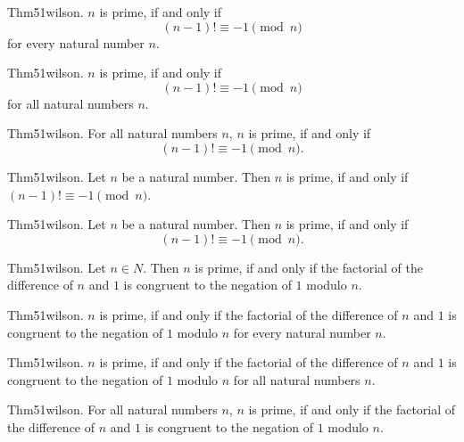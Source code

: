 \documentclass{article}
\begin{document}
Thm51wilson. $n$ is prime, if and only if $$(n - 1)! \equiv - 1 \pmod{ n}$$ for every natural number $n$.

Thm51wilson. $n$ is prime, if and only if $$(n - 1)! \equiv - 1 \pmod{ n}$$ for all natural numbers $n$.

Thm51wilson. For all natural numbers $n$, $n$ is prime, if and only if $$(n - 1)! \equiv - 1 \pmod{ n}.$$

Thm51wilson. Let $n$ be a natural number. Then $n$ is prime, if and only if $(n - 1)! \equiv - 1 \pmod{ n}$.

Thm51wilson. Let $n$ be a natural number. Then $n$ is prime, if and only if $$(n - 1)! \equiv - 1 \pmod{ n}.$$

Thm51wilson. Let $n \in N$. Then $n$ is prime, if and only if the factorial of the difference of $n$ and $1$ is congruent to the negation of $1$ modulo $n$.

Thm51wilson. $n$ is prime, if and only if the factorial of the difference of $n$ and $1$ is congruent to the negation of $1$ modulo $n$ for every natural number $n$.

Thm51wilson. $n$ is prime, if and only if the factorial of the difference of $n$ and $1$ is congruent to the negation of $1$ modulo $n$ for all natural numbers $n$.

Thm51wilson. For all natural numbers $n$, $n$ is prime, if and only if the factorial of the difference of $n$ and $1$ is congruent to the negation of $1$ modulo $n$.
\end{document}
